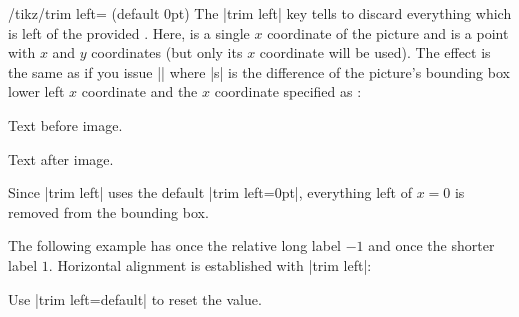 \begin{key}{/tikz/trim left= (default 0pt)}
    The |trim left| key tells \pgfname\space to discard everything which is
    left of the provided . Here, 
    is a single $x$ coordinate of the picture and  is a point
    with $x$ and $y$ coordinates (but only its $x$ coordinate will be used).
    The effect is the same as if you issue |\hspace{-s}| where |s| is the
    difference of the picture's bounding box lower left $x$ coordinate and the
    $x$ coordinate specified as :
\begin{codeexample}[]
Text before image.%
Text after image.
\end{codeexample}
    Since |trim left| uses the default |trim left=0pt|, everything left of
    $x=0$ is removed from the bounding box.

    The following example has once the relative long label $-1$ and once the
    shorter label $1$. Horizontal alignment is established with |trim left|:
\begin{codeexample}[pre={\vbox\bgroup\hsize=5cm},post=\egroup,width=8cm]
\par
{}
\par
{}
\par
{}
\end{codeexample}

    Use |trim left=default| to reset the value.
\end{key}

